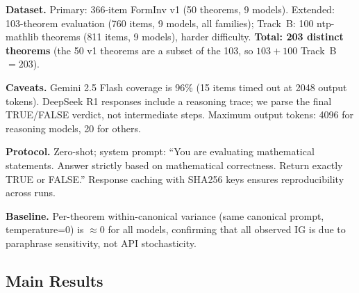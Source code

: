 \documentclass{article}
\begin{document}
\textbf{Dataset.} Primary: 366-item FormInv v1 (50 theorems, 9 models).
Extended: 103-theorem evaluation (760 items, 9 models, all families);
Track~B: 100 ntp-mathlib theorems (811 items, 9 models), harder difficulty.
\textbf{Total: 203 distinct theorems} (the 50 v1 theorems are a subset of the 103, so $103+100$ Track~B $=203$).

\textbf{Caveats.} Gemini 2.5 Flash coverage is 96\% (15 items timed out at 2048 output tokens).
DeepSeek R1 responses include a reasoning trace; we parse the final TRUE/FALSE verdict,
not intermediate steps. Maximum output tokens: 4096 for reasoning models, 20 for others.

\textbf{Protocol.} Zero-shot; system prompt: ``You are evaluating mathematical statements.
Answer strictly based on mathematical correctness. Return exactly TRUE or FALSE.''
Response caching with SHA256 keys ensures reproducibility across runs.

\textbf{Baseline.} Per-theorem within-canonical variance (same canonical prompt, temperature=0)
is $\approx 0$ for all models, confirming that all observed IG is due to paraphrase sensitivity,
not API stochasticity.

\subsection{Main Results}
\end{document}
